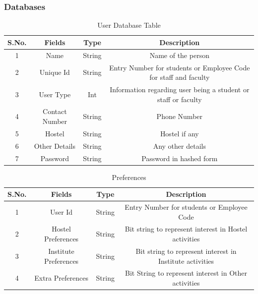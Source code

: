 \documentclass{article}
\begin{document}
					\subsubsection{Databases}
					\begin{table}[!htb]
\centering
\caption{User Database Table}
\label{my-label}
\begin{tabular}{|c|c|c|c|}
\hline
\textbf{S.No.} & \textbf{Fields} & \textbf{Type} & \textbf{Description}                                             \\ \hline
1              & Name            & String        & Name of the person                                               \\ \hline
2              & Unique Id       & String        & Entry Number for students or Employee Code for staff and faculty \\ \hline
3              & User Type       & Int           & Information regarding user being a student or staff or faculty   \\ \hline
4              & Contact Number  & String        & Phone Number                                                     \\ \hline
5              & Hostel          & String        & Hostel if any                                                    \\ \hline
6              & Other Details   & String        & Any other details                                                \\ \hline
7              & Password	 	 & String        & Password in hashed form                                          \\ \hline
\end{tabular}
\end{table}




\begin{table}[!htb]
\centering
\caption{Preferences}
\label{my-label}
\begin{tabular}{|c|c|c|c|}
\hline
\textbf{S.No.} & \textbf{Fields}            & \textbf{Type} & \textbf{Description}                                             \\ \hline
1              & User Id                    & String        & Entry Number for students or Employee Code \\ \hline
2              & Hostel Preferences         & String        & Bit string to represent interest in Hostel activities            \\ \hline
3              & Institute Preferences & String        & Bit string to represent interest in Institute activities         \\ \hline
4              & Extra Preferences          & String        & Bit String to represent interest in Other activities             \\ \hline
\end{tabular}
\end{table}
\end{document}
